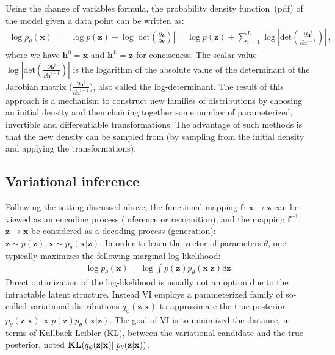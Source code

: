 \documentclass{article} %
\begin{document}
Using the change of variables formula, the probability density function~(pdf) of the model given a data point can be written as: 
\begin{align}\label{eq:flow}
\log p_\theta(\mathbf{x}) =& \log p(\mathbf{z})  + \log | \text{det} ( \frac{\partial \mathbf{z} }{\partial \mathbf{x}} ) | 
=  \log p(\mathbf{z}) + \sum_{i=1}^L\log | \text{det} ( \frac{\partial \mathbf{h}^i } {\partial \mathbf{h}^{i-1}}) | \, ,
\end{align}
where we have $\mathbf{h}^0 = \mathbf{x}$ and $\mathbf{h}^L = \mathbf{z}$ for conciseness. 
The scalar value $\log |\text{det}( \frac{\partial \mathbf{h}^i}{\partial \mathbf{h}^{i-1}})|$ is the logarithm of the absolute value of the determinant of the Jacobian matrix ($\frac{\partial \mathbf{h}^i}{ \partial\mathbf{h}^{i-1}}$), also called the log-determinant. 
The result of this approach is a mechanism to construct new families of distributions by choosing an initial density and then chaining together some number of parameterized, invertible and differentiable transformations. 
The advantage of such methods is that the new density can be sampled from (by sampling from the initial density and applying the transformations).

\subsection{Variational inference}
Following the setting discussed above, the functional mapping $\mathbf{f}$: $\mathbf{x} \xrightarrow{} \mathbf{z}$ can be viewed as an encoding process (inference or recognition), and the mapping $\mathbf{f}^{-1}$: $\mathbf{z} \xrightarrow{} \mathbf{x}$ be considered as a decoding process (generation):
$\mathbf{z} \sim p(\mathbf{z}), \mathbf{x} \sim p_\theta(\mathbf{x}|\mathbf{z}).$
In order to learn the vector of parameters $\theta$, one typically maximizes the following marginal log-likelihood:
\begin{align*}
    \log p_\theta(\mathbf{x}) = \log \int p(\mathbf{z})  p_\theta(\mathbf{x}|\mathbf{z})d\mathbf{z}.
\end{align*}
Direct optimization of the log-likelihood is usually not an option due to the intractable latent structure. Instead VI employs a parameterized family of so-called variational distributions $q_\phi(\mathbf{z}|\mathbf{x})$ to approximate the true posterior $p_\theta(\mathbf{z}|\mathbf{x}) \varpropto  p(\mathbf{z})  p_\theta(\mathbf{x}|\mathbf{z})$.
The goal of VI is to minimized the distance, in terms of Kullback-Leibler (KL), between the variational candidate and the true posterior, noted $\textbf{\text{KL}}(q_\phi(\mathbf{z}|\mathbf{x})||p_\theta(\mathbf{z}|\mathbf{x}) )$.
\end{document}
